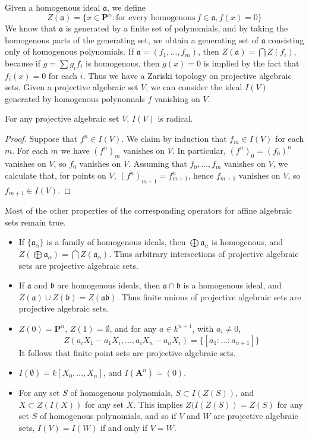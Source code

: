 Given a homogenous ideal $\mathfrak{a}$, we define
%
\[ Z(\mathfrak{a}) = \{ x \in \mathbf{P}^n: \text{for every homogenous}\ f \in \mathfrak{a}, f(x) = 0 \} \]
%
We know that $\mathfrak{a}$ is generated by a finite set of polynomials, and by taking the homogenous parts of the generating set, we obtain a generating set of $\mathfrak{a}$ consisting only of homogenous polynomials. If $\mathfrak{a} = (f_1, \dots, f_m)$, then $Z(\mathfrak{a}) = \bigcap Z(f_i)$, because if $g = \sum g_i f_i$ is homogenous, then $g(x) = 0$ is implied by the fact that $f_i(x) = 0$ for each $i$. Thus we have a Zariski topology on projective algebraic sets. Given a projective algebraic set $V$, we can consider the ideal $I(V)$ generated by homogenous polynomials $f$ vanishing on $V$.

\begin{theorem}
    For any projective algebraic set $V$, $I(V)$ is radical.
\end{theorem}
\begin{proof}
    Suppose that $f^n \in I(V)$. We claim by induction that $f_m \in I(V)$ for each $m$. For each $m$ we have $(f^n)_m$ vanishes on $V$. In particular, $(f^n)_0 = (f_0)^n$ vanishes on $V$, so $f_0$ vanishes on $V$. Assuming that $f_0, \dots, f_m$ vanishes on $V$, we calculate that, for points on $V$, $(f^n)_{m+1} = f_{m+1}^n$, hence $f_{m+1}$ vanishes on $V$, so $f_{m+1} \in I(V)$.
\end{proof}

Most of the other properties of the corresponding operators for affine algebraic sets remain true.
%
\begin{itemize}
    \item If $\{ \mathfrak{a}_\alpha \}$ is a family of homogenous ideals, then $\bigoplus \mathfrak{a}_\alpha$ is homogenous, and $Z(\bigoplus \mathfrak{a}_\alpha) = \bigcap Z(\mathfrak{a}_\alpha)$. Thus arbitrary intersections of projective algebraic sets are projective algebraic sets.

    \item If $\mathfrak{a}$ and $\mathfrak{b}$ are homogenous ideals, then $\mathfrak{a} \cap \mathfrak{b}$ is a homogenous ideal, and $Z(\mathfrak{a}) \cup Z(\mathfrak{b}) = Z(\mathfrak{a}\mathfrak{b})$. Thus finite unions of projective algebraic sets are projective algebraic sets.

    \item $Z(0) = \mathbf{P}^n$, $Z(1) = \emptyset$, and for any $a \in k^{n+1}$, with $a_i \neq 0$,
    \[ Z(a_iX_1 - a_1X_i, \dots, a_iX_n - a_nX_i) = \{ [a_1:\dots:a_{n+1}] \} \]
    It follows that finite point sets are projective algebraic sets.

    \item $I(\emptyset) = k[X_0, \dots, X_n]$, and $I(\mathbf{A}^n) = (0)$.

    \item For any set $S$ of homogenous polynomials, $S \subset I(Z(S))$, and $X \subset Z(I(X))$ for any set $X$. This implies $Z(I(Z(S)) = Z(S)$ for any set $S$ of homogenous polynomials, and so if $V$ and $W$ are projective algebraic sets, $I(V) = I(W)$ if and only if $V = W$.
\end{itemize}

